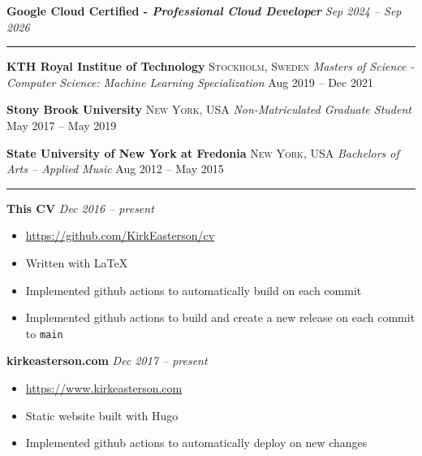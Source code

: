 \documentclass[10pt,letterpaper]{article}
\begin{document}

\headedsection
{\textbf{Google Cloud Certified - \textit{Professional Cloud Developer}}}
{\textit{Sep 2024 -- Sep 2026}} {}
\begin{center}\hrule\end{center}



\headedsection
{\textbf{KTH Royal Institue of Technology}}
{\textsc{Stockholm, Sweden}} {
	\headedsubsection
	{\textit{Masters of Science - Computer Science: Machine Learning Specialization}}
	{Aug 2019 -- Dec 2021}
	{}
}

\headedsection
{\textbf{Stony Brook University}}
{\textsc{New York, USA}} {
	\headedsubsection
	{\textit{Non-Matriculated Graduate Student}}
	{May 2017 -- May 2019}
	{}
}

\headedsection
{\textbf{State University of New York at Fredonia}}
{\textsc{New York, USA}} {
	\headedsubsection
	{\textit{Bachelors of Arts -- Applied Music}}
	{Aug 2012 -- May 2015}
	{}
}
\begin{center}\hrule\end{center}


\headedsection
{\textbf{This CV}}
{\textit{Dec 2016 -- present}} {
	\begin{itemize}[noitemsep,nolistsep]
		\item \url{https://github.com/KirkEasterson/cv}
		\item Written with \LaTeX
		\item Implemented github actions to automatically build on each commit
		\item Implemented github actions to build and create a new release on each commit to \texttt{main}
	\end{itemize}
}

\headedsection
{\textbf{kirkeasterson.com}}
{\textit{Dec 2017 -- present}} {
	\begin{itemize}[noitemsep,nolistsep]
		\item \url{https://www.kirkeasterson.com}
		\item Static website built with Hugo
		\item Implemented github actions to automatically deploy on new changes
	\end{itemize}
}
\end{document}
